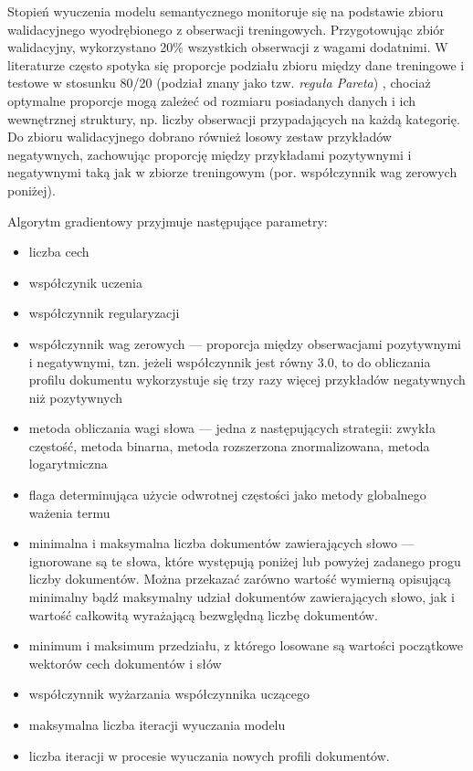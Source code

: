 \documentclass{pracamgr}
\begin{document}
Stopień wyuczenia modelu semantycznego monitoruje się na podstawie zbioru walidacyjnego wyodrębionego z obserwacji treningowych. Przygotowując zbiór walidacyjny, wykorzystano 20\% wszystkich obserwacji z wagami dodatnimi. W literaturze często spotyka się proporcje podziału zbioru między dane treningowe i testowe w stosunku 80/20 (podział znany jako tzw. \textit{reguła Pareta}) \cite{suthaharan}, chociaż optymalne proporcje mogą zależeć od rozmiaru posiadanych danych i ich wewnętrznej struktury, np. liczby obserwacji przypadających na każdą kategorię. Do zbioru walidacyjnego dobrano również losowy zestaw przykładów negatywnych, zachowując proporcję między przykładami pozytywnymi i negatywnymi taką jak w zbiorze treningowym (por. współczynnik wag zerowych poniżej).

Algorytm gradientowy przyjmuje następujące parametry:
\begin{itemize}
    \item liczba cech
    \item współczynik uczenia
    \item współczynnik regularyzacji
    \item współczynnik wag zerowych --- proporcja między obserwacjami pozytywnymi i negatywnymi, tzn. jeżeli współczynnik jest równy 3.0, to do obliczania profilu dokumentu wykorzystuje się trzy razy więcej przykładów negatywnych niż pozytywnych
    \item metoda obliczania wagi słowa --- jedna z następujących strategii: zwykła częstość, metoda binarna, metoda rozszerzona znormalizowana, metoda logarytmiczna
    \item flaga determinująca użycie odwrotnej częstości jako metody globalnego ważenia termu
    \item minimalna i maksymalna liczba dokumentów zawierających słowo --- ignorowane są te słowa, które występują poniżej lub powyżej zadanego progu liczby dokumentów. Można przekazać zarówno wartość wymierną opisującą minimalny bądź maksymalny udział dokumentów zawierających słowo, jak i wartość całkowitą wyrażającą bezwględną liczbę dokumentów.
    \item minimum i maksimum przedziału, z którego losowane są wartości początkowe wektorów cech dokumentów i słów
    \item współczynnik wyżarzania współczynnika uczącego
    \item maksymalna liczba iteracji wyuczania modelu
    \item liczba iteracji w procesie wyuczania nowych profili dokumentów.
\end{itemize}
\end{document}
